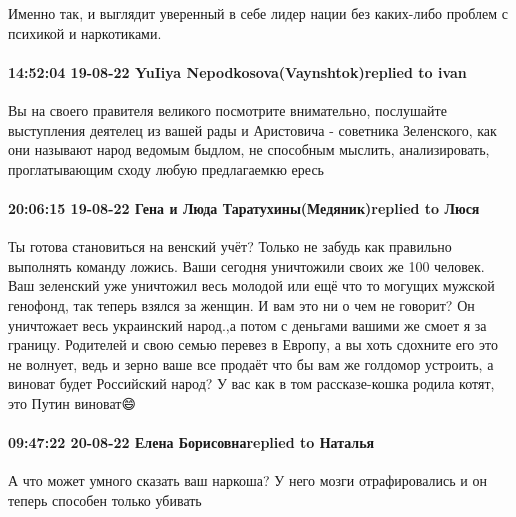 Именно так, и выглядит уверенный в себе лидер нации без каких-либо проблем с
психикой и наркотиками.

\paragraph{14:52:04 19-08-22 YuIiya Nepodkosova(Vaynshtok)replied to ivan}

Вы на своего правителя великого посмотрите внимательно, послушайте выступления
деятелец из вашей рады и Аристовича - советника Зеленского, как они называют
народ ведомым быдлом, не способным мыслить, анализировать, проглатывающим сходу
любую предлагаемкю ересь

\paragraph{20:06:15 19-08-22 Гена и Люда Таратухины(Медяник)replied to Люся}

Ты готова становиться на венский учёт? Только не забудь как правильно выполнять
команду ложись. Ваши сегодня уничтожили своих же 100 человек. Ваш зеленский уже
уничтожил весь молодой или ещё что то могущих мужской генофонд, так теперь
взялся за женщин. И вам это ни о чем не говорит? Он уничтожает весь украинский
народ.,а потом с деньгами вашими же смоет я за границу. Родителей и свою семью
перевез в Европу, а вы хоть сдохните его это не волнует, ведь и зерно ваше все
продаёт что бы вам же голдомор устроить, а виноват будет Российский народ? У
вас как в том рассказе-кошка родила котят, это Путин виноват😄

\paragraph{09:47:22 20-08-22 Елена Борисовнаreplied to Наталья}

А что может умного сказать ваш наркоша? У него мозги отрафировались и он теперь
способен только убивать
